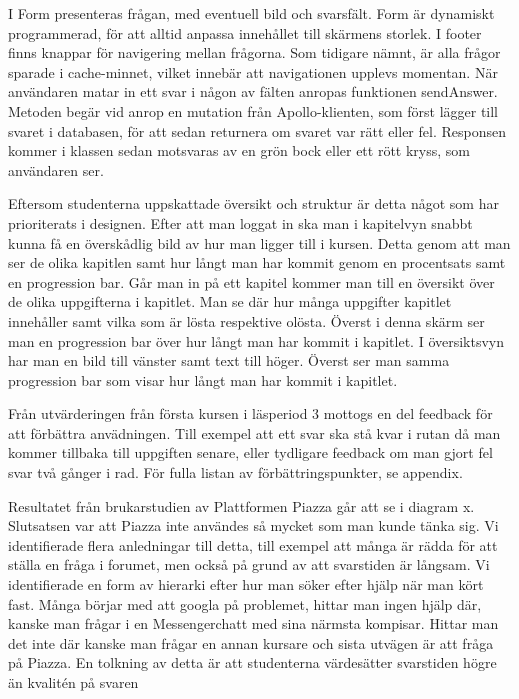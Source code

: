 I Form presenteras frågan, med eventuell bild och svarsfält. Form är dynamiskt programmerad, för att alltid anpassa innehållet till skärmens storlek. I footer finns knappar för navigering mellan frågorna. Som tidigare nämnt, är alla frågor sparade i cache-minnet, vilket innebär att navigationen upplevs momentan. När användaren matar in ett svar i någon av fälten anropas funktionen sendAnswer. Metoden begär vid anrop en mutation från Apollo-klienten, som först lägger till svaret i databasen, för att sedan returnera om svaret var rätt eller fel. Responsen kommer i klassen sedan motsvaras av en grön bock eller ett rött kryss, som användaren ser. 

Eftersom studenterna uppskattade översikt och struktur är detta något som har prioriterats i designen. Efter att man loggat in ska man i kapitelvyn snabbt kunna få en överskådlig bild av hur man ligger till i kursen. Detta genom att man ser de olika kapitlen samt hur långt man har kommit genom en procentsats samt en progression bar. Går man in på ett kapitel kommer man till en översikt över de olika uppgifterna i kapitlet. Man se där hur många uppgifter kapitlet innehåller samt vilka som är lösta respektive olösta. Överst i denna skärm ser man en progression bar över hur långt man har kommit i kapitlet. I översiktsvyn har man en bild till vänster samt text till höger. Överst ser man samma progression bar som visar hur långt man har kommit i kapitlet. 

Från utvärderingen från första kursen i läsperiod 3 mottogs en del feedback för att förbättra anvädningen. Till exempel att ett svar ska stå kvar i rutan då man kommer tillbaka till uppgiften senare, eller tydligare feedback om man gjort fel svar två gånger i rad. För fulla listan av förbättringspunkter, se appendix. 

Resultatet från brukarstudien av Plattformen Piazza går att se i diagram x. Slutsatsen var att Piazza inte användes så mycket som man kunde tänka sig. Vi identifierade flera anledningar till detta, till exempel att många är rädda för att ställa en fråga i forumet, men också på grund av att svarstiden är långsam. Vi identifierade en form av hierarki efter hur man söker efter hjälp när man kört fast. Många börjar med att googla på problemet, hittar man ingen hjälp där, kanske man frågar i en Messengerchatt med sina närmsta kompisar. Hittar man det inte där kanske man frågar en annan kursare och sista utvägen är att fråga på Piazza. En tolkning av detta är att studenterna värdesätter svarstiden högre än kvalitén på svaren

